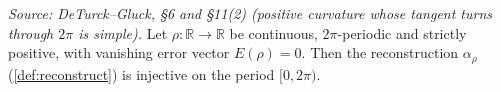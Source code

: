 \begin{theorem}

  \label{thm:reconstruct_injective}
  \textit{Source: DeTurck--Gluck, §6 and §11(2) (positive curvature whose tangent
  turns through $2\pi$ is simple).}
  Let $\rho : \mathbb{R} \to \mathbb{R}$ be continuous, $2\pi$-periodic and
  strictly positive, with vanishing error vector $E(\rho) = 0$. Then the
  reconstruction $\alpha_\rho$ (\cref{def:reconstruct}) is injective on the period
  $[0, 2\pi)$.
\end{theorem}
